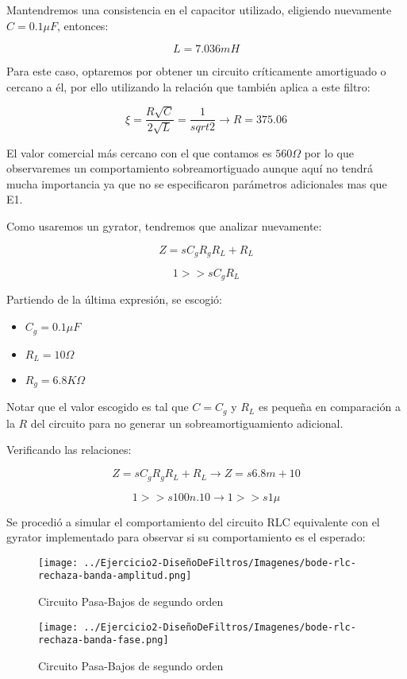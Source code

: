 Mantendremos una consistencia en el capacitor utilizado, eligiendo nuevamente $C=0.1 \mu F$, entonces:

$$L = 7.036 mH$$

Para este caso, optaremos por obtener un circuito críticamente amortiguado o cercano a él, por ello utilizando la relación que también aplica a este
filtro:

$$\xi=\frac{R \sqrt{C}}{2\sqrt{L}}=\frac{1}{sqrt{2}} \longrightarrow R=375.06$$

El valor comercial más cercano con el que contamos es $560 \Omega$ por lo que observaremes un comportamiento sobreamortiguado aunque aquí
no tendrá mucha importancia ya que no se especificaron parámetros adicionales mas que E1.

Como usaremos un gyrator, tendremos que analizar nuevamente:

$$Z=sC_gR_gR_L+R_L$$

$$1 >> sC_gR_L$$

Partiendo de la última expresión, se escogió:

\begin{itemize}
	\item $C_g=0.1 \mu F$
	\item $R_L=10 \Omega$
	\item $R_g=6.8K \Omega$
\end{itemize}

Notar que el valor escogido es tal que $C=C_g$ y $R_L$ es pequeña en comparación a la $R$ del circuito para no generar
un sobreamortiguamiento adicional.

Verificando las relaciones:

$$Z=sC_gR_gR_L+R_L \longrightarrow Z = s6.8m + 10$$

$$1 >> s100n.10 \longrightarrow 1  >> s1\mu$$

Se procedió a simular el comportamiento del circuito RLC equivalente con el gyrator implementado para observar si su comportamiento es el esperado:


\begin{figure}[H]
    \centering
    \texttt{[image: ../Ejercicio2-DiseñoDeFiltros/Imagenes/bode-rlc-rechaza-banda-amplitud.png]}
    \caption{Circuito Pasa-Bajos de segundo orden}
\end{figure}

\begin{figure}[H]
    \centering
    \texttt{[image: ../Ejercicio2-DiseñoDeFiltros/Imagenes/bode-rlc-rechaza-banda-fase.png]}
    \caption{Circuito Pasa-Bajos de segundo orden}
\end{figure}

